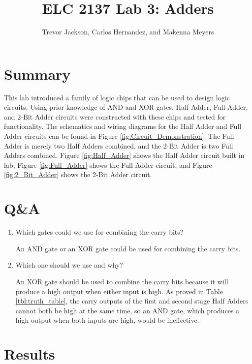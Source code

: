 \documentclass[11pt]{article}
\begin{document}
\title{ELC 2137 Lab 3: Adders}
\author{Trevor Jackson, Carlos Hernandez, and Makenna Meyers}

\maketitle


\section*{Summary}

This lab introduced a family of logic chips that can be used to design logic circuits. Using prior knowledge of AND and XOR gates, Half Adder, Full Adder, and 2-Bit Adder circuits were constructed with these chips and tested for functionality. The schematics and wiring diagrams for the Half Adder and Full Adder circuits can be found in Figure \ref{fig:Circuit_Demonstration}. The Full Adder is merely two Half Adders combined, and the 2-Bit Adder is two Full Adders combined. Figure \ref{fig:Half_Adder} shows the Half Adder circuit built in lab, Figure \ref{fig:Full_Adder} shows the Full Adder circuit, and Figure \ref{fig:2_Bit_Adder} shows the 2-Bit Adder circuit.

\section*{Q\&A}

\begin{enumerate}
	\item Which gates could we use for combining the carry bits?
	
An AND gate or an XOR gate could be used for combining the carry bits.
	
	\item Which one should we use and why?

An XOR gate should be used to combine the carry bits because it will produce a high output when either input is high. As proved in Table \ref{tbl:truth_table}, the carry outputs of the first and second stage Half Adders cannot both be high at the same time, so an AND gate, which produces a high output when both inputs are high, would be ineffective.
   
\end{enumerate}

\section*{Results}
\end{document}
